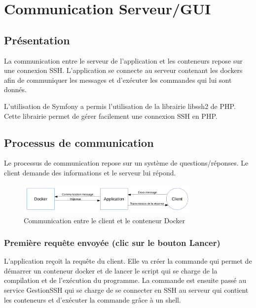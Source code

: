 \section{Communication Serveur/GUI}

\subsection{Présentation}

\par La communication entre le serveur de l'application et les conteneurs repose sur une connexion SSH. L'application se connecte au serveur contenant les dockers afin de communiquer les messages et d'exécuter les commandes qui lui sont donnés.

\par L'utilisation de Symfony a permis l'utilisation de la librairie libssh2 de PHP. Cette librairie permet de gérer facilement une connexion SSH en PHP.

\subsection{Processus de communication}

\par Le processus de communication repose sur un système de questions/réponses. Le client demande des informations et le serveur lui répond.

\begin{figure}[H]
\centering
\includegraphics[width=0.8\textwidth]{./img/communication/com.png}
\caption{Communication entre le client et le conteneur Docker}
\end{figure}


\subsubsection{Première requête envoyée (clic sur le bouton Lancer)}

\par L'application reçoit la requête du client. Elle va créer la commande qui permet de démarrer un conteneur docker et de lancer le script qui se charge de la compilation et de l'exécution du programme. La commande est ensuite passé au service GestionSSH qui se charge de se connecter en SSH au serveur qui contient les conteneurs et d'exécuter la commande grâce à un shell. 

